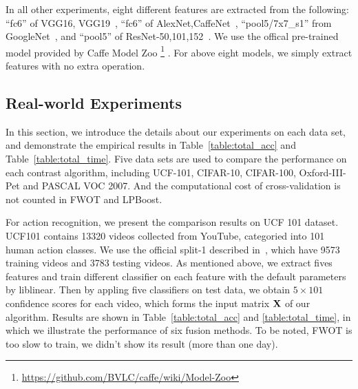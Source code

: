 \documentclass[letterpaper]{article}
\def\bX{{\bf X}}
\def\bX{{\bf X}}
\begin{document}
In all other experiments, eight different features are extracted from the following:
``fc6'' of VGG16, VGG19~\cite{chatfield2014return},
``fc6'' of AlexNet,CaffeNet~\cite{krizhevsky2012imagenet},
``pool5/7x7\_s1'' from GoogleNet~\cite{szegedy2015going},
and ``pool5'' of ResNet-50,101,152~\cite{he2015deep}.
We use the offical pre-trained model provided by Caffe Model Zoo
\footnote{\url{https://github.com/BVLC/caffe/wiki/Model-Zoo}}
.
For above eight models, we simply extract features with no extra operation.




\subsection{Real-world Experiments}

In this section, we introduce the details about our experiments on each data set,
and demonstrate the empirical results in Table~\ref{table:total_acc} and Table~\ref{table:total_time}.
Five data sets are used to compare the performance on each contrast algorithm, including UCF-101, CIFAR-10, CIFAR-100, Oxford-III-Pet and PASCAL VOC 2007.
And the computational cost of cross-validation is not counted in FWOT and LPBoost.

For action recognition, we present the comparison results on UCF 101 dataset.
UCF101 contains 13320 videos collected from YouTube, categoried into 101 human action classes.
We use the official split-1 described in~\cite{soomro2012ucf101}, which have 9573 training videos and 3783 testing videos.
As mentioned above, we extract fives features and train different classifier on each feature with the default parameters by liblinear.
Then by appling five classifiers on test data, we obtain $5 \times 101$ confidence scores for each video, which forms the input matrix $\bX$ of our algorithm.
Results are shown in Table~\ref{table:total_acc} and \ref{table:total_time}, in which we illustrate the performance of six fusion methods.
To be noted, FWOT is too slow to train, we didn't show its result (more than one day).
\end{document}
